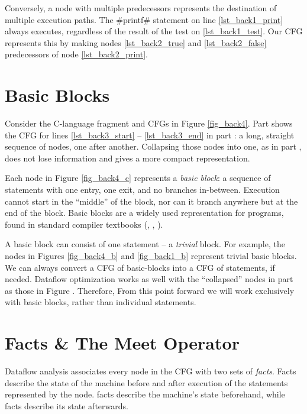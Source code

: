 \documentclass[12pt]{report}
\begin{document}
Conversely, a node with multiple predecessors represents the
destination of multiple execution paths. The #printf# statement on
line \ref{lst_back1_print} always executes, regardless of the result
of the test on \ref{lst_back1_test}. Our CFG represents this by making
nodes \ref{lst_back2_true} and \ref{lst_back2_false} predecessors of
node \ref{lst_back2_print}.

\section{Basic Blocks}
\label{sec_back3}

Consider the C-language fragment and CFGs in Figure
\ref{fig_back4}. Part  shows the CFG for lines
\ref{lst_back3_start} -- \ref{lst_back3_end} in part
: a long, straight sequence of nodes, one after
another. Collapsing those nodes into one, as in part
, does not lose information and gives a more
compact representation. 

\afterpage{\clearpage{}\clearpage}

Each node in Figure \ref{fig_back4_c} represents a \emph{basic block}:
a sequence of statements with one entry, one exit, and no branches
in-between. Execution cannot start in the ``middle'' of the block, nor
can it branch anywhere but at the end of the block. Basic blocks are a
widely used representation for programs, found in standard compiler
textbooks (\citep{AhoXX}, \citep{MunchXX}, \citep{AppelXX}).

A basic block can consist of one statement -- a \emph{trivial}
block. For example, the nodes in Figures \ref{fig_back4_b} and
\ref{fig_back1_b} represent trivial basic blocks. We can always
convert a CFG of basic-blocks into a CFG of statements, if needed.
Dataflow optimization works as well with the ``collapsed'' nodes in
part  as those in Figure
. Therefore, From this point forward we will work
exclusively with basic blocks, rather than individual statements.

\section{Facts \& The Meet Operator}
\label{sec_back4}
Dataflow analysis associates every node in the CFG with two sets of
\emph{facts}. Facts describe the state of the machine before and after
execution of the statements represented by the node. \In facts
describe the machine's state beforehand, while \out facts
describe its state afterwards.
\end{document}
